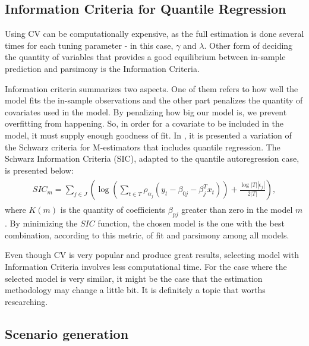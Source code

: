 \subsection{Information Criteria for Quantile Regression}
Using CV can be computationally expensive, as the full estimation is done several times for each tuning parameter - in this case, $\gamma$ and $\lambda$. Other form of deciding the quantity of variables that provides a good equilibrium between in-sample prediction and parsimony is the Information Criteria.

Information criteria summarizes two aspects. One of them refers to how well the model fits the in-sample observations and the other part penalizes the quantity of covariates used in the model. By penalizing how big our model is, we prevent overfitting from happening. So, in order for a covariate to be included in the model, it must supply enough goodness of fit.
In \cite{machado1993robust}, it is presented a variation of the Schwarz criteria for M-estimators that includes quantile regression. The Schwarz Information Criteria (SIC), adapted to the quantile autoregression case, is presented below:
{\small
\begin{align} 
\begin{split}
SIC_m = \sum_{j \in J} \left( \log \left(\sum_{t \in T}\rho_{\alpha_j}(y_t - \beta_{0j} - \beta_j^T x_t) \right) +  \frac{\log|T||\epsilon_j|}{2|T|}  \right),\label{eq:SIC}
\end{split}					
\end{align}}
where $K(m)$ is the quantity of coefficients $\beta_{pj}$ greater than zero in the model $m$.
By minimizing the $SIC$ function, the chosen model is the one with the best combination, according to this metric, of fit and parsimony among all models. 

Even though CV is very popular and produce great results, selecting model with Information Criteria involves less computational time. For the case where the selected model is very similar, it might be the case that the estimation methodology may change a little bit. It is definitely a topic that worths researching.







\subsection{Scenario generation} \label{sec:scenario-generation}


